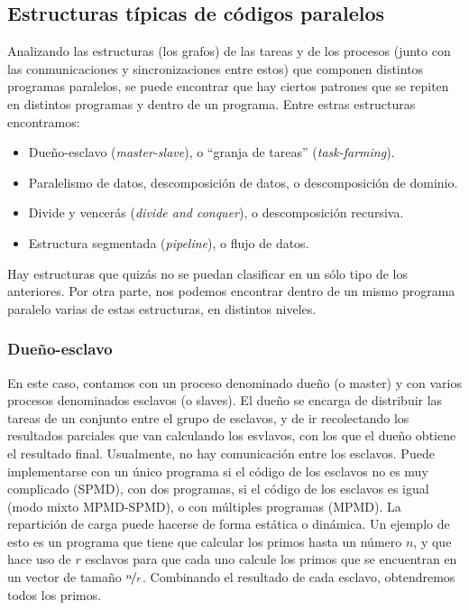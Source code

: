 \subsection{Estructuras típicas de códigos paralelos}
Analizando las estructuras (los grafos) de las tareas y de los procesos (junto con las conmunicaciones y sincronizaciones entre estos) que componen distintos programas paralelos, se puede encontrar que hay ciertos patrones que se repiten en distintos programas y dentro de un programa. Entre estras estructuras encontramos:
\begin{itemize}
    \item Dueño-esclavo (\emph{master-slave}), o ``granja de tareas'' (\emph{task-farming}).
    \item Paralelismo de datos, descomposición de datos, o descomposición de dominio. 
    \item Divide y vencerás (\emph{divide and conquer}), o descomposición recursiva. 
    \item Estructura segmentada (\emph{pipeline}), o flujo de datos.
\end{itemize}
Hay estructuras que quizás no se puedan clasificar en un sólo tipo de los anteriores. Por otra parte, nos podemos encontrar dentro de un mismo programa paralelo varias de estas estructuras, en distintos niveles.

\subsubsection{Dueño-esclavo} 
En este caso, contamos con un proceso denominado dueño (o master) y con varios procesos denominados esclavos (o slaves). El dueño se encarga de distribuir las tareas de un conjunto entre el grupo de esclavos, y de ir recolectando los resultados parciales que van calculando los esvlavos, con los que el dueño obtiene el resultado final. Usualmente, no hay comunicación entre los esclavos.
Puede implementarse con un único programa si el código de los esclavos no es muy complicado (SPMD), con dos programas, si el código de los esclavos es igual (modo mixto MPMD-SPMD), o con múltiples programas (MPMD).
La repartición de carga puede hacerse de forma estática o dinámica.
Un ejemplo de esto es un programa que tiene que calcular los primos hasta un número $n$, y que hace uso de $r$ esclavos para que cada uno calcule los primos que se encuentran en un vector de tamaño $ \nicefrac{n}{r} $. Combinando el resultado de cada esclavo, obtendremos todos los primos.

